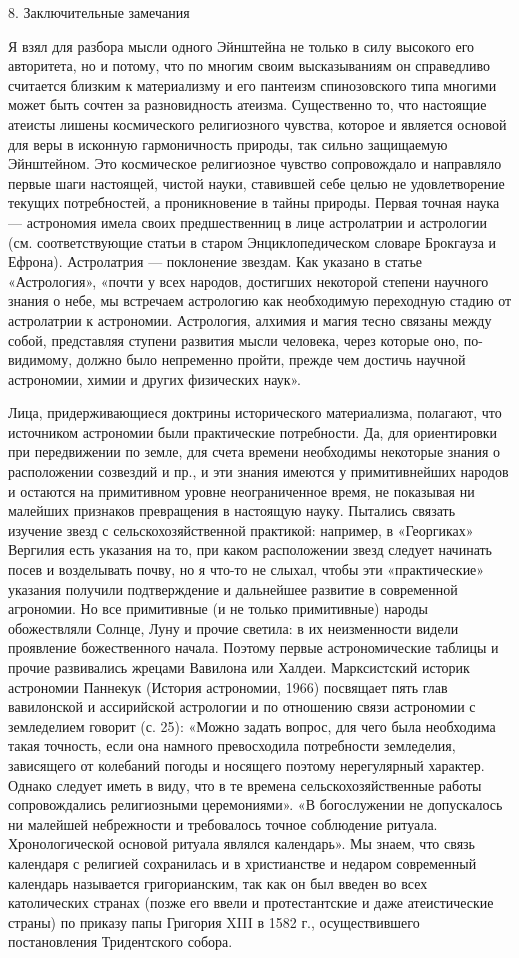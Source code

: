 8. Заключительные замечания

Я взял для разбора мысли одного Эйнштейна не только в силу высокого его
авторитета, но и потому, что по многим своим высказываниям он справедливо
считается близким к материализму и его пантеизм спинозовского типа многими
может быть сочтен за разновидность атеизма. Существенно то, что настоящие
атеисты лишены космического религиозного чувства, которое и является основой
для веры в исконную гармоничность природы, так сильно защищаемую Эйнштейном.
Это космическое религиозное чувство сопровождало и направляло первые шаги
настоящей, чистой науки, ставившей себе целью не удовлетворение текущих
потребностей, а проникновение в тайны природы. Первая точная наука --- астрономия
имела своих предшественниц в лице астролатрии и астрологии (см.
соответствующие статьи в старом Энциклопедическом словаре Брокгауза и Ефрона).
Астролатрия --- поклонение звездам. Как указано в статье «Астрология», «почти у
всех народов, достигших некоторой степени научного знания о небе, мы встречаем
астрологию как необходимую переходную стадию от астролатрии к астрономии.
Астрология, алхимия и магия тесно связаны между собой, представляя ступени
развития мысли человека, через которые оно, по-видимому, должно было непременно
пройти, прежде чем достичь научной астрономии, химии и других физических наук».

Лица, придерживающиеся доктрины исторического материализма, полагают, что
источником астрономии были практические потребности. Да, для ориентировки при
передвижении по земле, для счета времени необходимы некоторые знания о
расположении созвездий и пр., и эти знания имеются у примитивнейших народов и
остаются на примитивном уровне неограниченное время, не показывая ни малейших
признаков превращения в настоящую науку. Пытались связать изучение звезд с
сельскохозяйственной практикой: например, в «Георгиках» Вергилия есть указания
на то, при каком расположении звезд следует начинать посев и возделывать почву,
но я что-то не слыхал, чтобы эти «практические» указания получили подтверждение
и дальнейшее развитие в современной агрономии. Но все примитивные (и не только
примитивные) народы обожествляли Солнце, Луну и прочие светила: в их
неизменности видели проявление божественного начала. Поэтому первые
астрономические таблицы и прочие развивались жрецами Вавилона или Халдеи.
Марксистский историк астрономии Паннекук (История астрономии, 1966) посвящает
пять глав вавилонской и ассирийской астрологии и по отношению связи астрономии
с земледелием говорит (с. 25): «Можно задать вопрос, для чего была необходима
такая точность, если она намного превосходила потребности земледелия,
зависящего от колебаний погоды и носящего поэтому нерегулярный характер. Однако
следует иметь в виду, что в те времена сельскохозяйственные работы
сопровождались религиозными церемониями». «В богослужении не допускалось ни
малейшей небрежности и требовалось точное соблюдение ритуала. Хронологической
основой ритуала являлся календарь». Мы знаем, что связь календаря с религией
сохранилась и в христианстве и недаром современный календарь называется
григорианским, так как он был введен во всех католических
странах (позже его ввели и протестантские и даже атеистические страны) по
приказу папы Григория XIII в 1582 г., осуществившего постановления Тридентского
собора.

